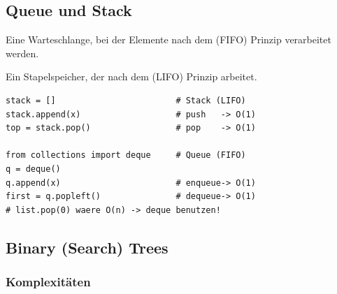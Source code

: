 \subsection{Queue und Stack}\label{sec:09-queue-und-stack}
\begin{defbox}[Queue]
Eine Warteschlange, bei der Elemente nach dem  (FIFO) Prinzip verarbeitet werden.
\begin{factlist}
\end{factlist}
\end{defbox}

\begin{defbox}[Stack]
Ein Stapelspeicher, der nach dem  (LIFO) Prinzip arbeitet.
\begin{factlist}
\end{factlist}
\end{defbox}
\begin{codebox}
\begin{lstlisting}[style=CodeExpert]
stack = []                        # Stack (LIFO)
stack.append(x)                   # push   -> O(1)
top = stack.pop()                 # pop    -> O(1)

from collections import deque     # Queue (FIFO)
q = deque()
q.append(x)                       # enqueue-> O(1)
first = q.popleft()               # dequeue-> O(1)
# list.pop(0) waere O(n) -> deque benutzen!
\end{lstlisting}
\end{codebox}
\begin{contentbox}[Komplexitäten]
\begin{factlist}
\end{factlist}
\end{contentbox}

\subsection{Binary (Search) Trees}\label{sec:09-binary-search-trees}
\subsubsection{Komplexitäten}
\begin{contentbox}
\begin{factlist}
\end{factlist}
\end{contentbox}
